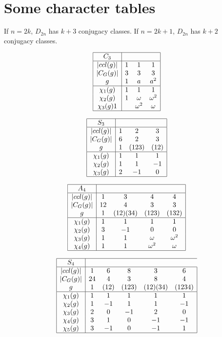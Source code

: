 {\section {Some character tables}

If $n=2k$, $D_{2n}$ has $k+3$ conjugacy classes.  If $n=2k+1$, $D_{2n}$ has $k+2$ conjugacy classes.

$$
\begin{array}{|c|ccc|}
\hline
C_3&&&\\
\hline
|ccl(g)|&1&1&1\\
|C_G(g)|&3&3&3\\
g&1&a&a^2\\
\hline
\chi_1(g)&1&1&1\\
\chi_2(g)&1&\omega&\omega^2\\
\chi_3(g)1&&\omega^2&\omega\\
\hline
\end{array}
$$

$$
\begin{array}{|c|ccc|}
\hline
S_3&&&\\
\hline
|ccl(g)|&1&2&3\\
|C_G(g)|&6&2&3\\
g&1&(123)&(12)\\
\hline
\chi_1(g)&1&1&1\\
\chi_2(g)&1&1&-1\\
\chi_3(g)&2&-1&0\\
\hline
\end{array}
$$

$$
\begin{array}{|c|cccc|}
\hline
A_4&&&&\\
\hline
|ccl(g)|&1&3&4&4\\
|C_G(g)|&12&4&3&3\\
g&1&(12)(34)&(123)&(132)\\
\hline
\chi_1(g)&1&1&1&1\\
\chi_2(g)&3&-1&0&0\\
\chi_3(g)&1&1&\omega&\omega^2 \\
\chi_4(g)&1&1&\omega^2&\omega \\
\hline
\end{array}
$$

$$
\begin{array}{|c|ccccc|}
\hline
S_4&&&&\\
\hline
|ccl(g)|&1&6&8&3&6\\
|C_G(g)|&24&4&3&8&4\\
g&1&(12)&(123)& (12)(34)&(1234)\\
\hline
\chi_1(g)&1&1&1&1&1\\
\chi_2(g)&1&-1&1&1&-1\\
\chi_3(g)&2&0&-1&2&0\\
\chi_4(g)&3&1&0&-1&-1\\
\chi_5(g)&3&-1&0&-1&1\\
\hline
\end{array}
$$

}
